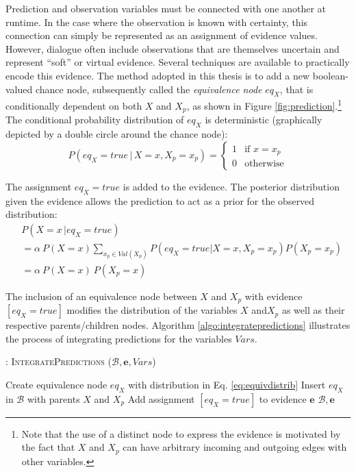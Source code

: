 Prediction and observation variables must be connected with one another at runtime.  In the case where the observation is known with certainty, this connection can simply be represented as an assignment of evidence values.  However, dialogue often include observations that are themselves uncertain and represent ``soft'' or virtual evidence.  Several techniques are available to practically encode this evidence. The method adopted in this thesis is to add a new boolean-valued chance node, subsequently called the \textit{equivalence node} $eq_{X}$, that is conditionally dependent on both $X$ and $X_p$, as shown in Figure \ref{fig:prediction}.\footnote{Note that the use of a distinct node to express the evidence is motivated by the fact that $X$ and $X_p$ can have arbitrary incoming and outgoing edges with other variables.} The conditional probability distribution of $eq_X$ is deterministic (graphically depicted by a double circle around the chance node): 
\begin{equation}
P(eq_{X}\!=\!true \, | \, X\!=\!x, X_p\!=\!x_p) = \begin{cases}
1 & \text{if } x = x_p \\
0 & \text{otherwise}
\end{cases} \label{eq:equivdistrib}
\end{equation}

The assignment $eq_{X} \!=\! true$ is added to the evidence. The posterior distribution given the evidence allows the prediction to act as a prior for the observed distribution:
\begin{align}
&P(X = x \, | eq_{X}\!=\!true) \nonumber \\
&=  \alpha \ P(X\!=\!x)  \sum_{x_p \in Val(X_p)} P(eq_{X}\!=\!true | X\!=\!x, X_p \!=\!x_p ) P(X_p\!=\!x_p) \\
&= \alpha \ P(X\!=\!x) \ P(X_p\!=\!x) \label{eq:equivalence}
\end{align}

The inclusion of an equivalence node between $X$ and $X_p$ with evidence  $[eq_{X}\!=\!true]$ modifies the distribution of the variables $X$ and$X_p$ as well as their respective parents/children nodes.  Algorithm \ref{algo:integratepredictions} illustrates the process of integrating predictions for the variables $\mathit{Vars}$. 

\begin{algorithm}[h]
\caption{: \textsc{IntegratePredictions} ($\mathcal{B}, \mathbf{e}, \mathit{Vars}$)}
\begin{algorithmic}[1] \vspace{1mm}
\STATE Create equivalence node $eq_{X}$ with distribution in Eq. \eqref{eq:equivdistrib}
\STATE Insert $eq_{X}$ in $\mathcal{B}$ with parents $\mathit{X}$ and $\mathit{X}_p$
\STATE Add assignment $[eq_{X}\!=\!true]$ to evidence $\mathbf{e}$
\ENDIF
\ENDFOR
\RETURN $\mathcal{B}, \mathbf{e}$
\end{algorithmic}
\label{algo:integratepredictions}
\end{algorithm}



